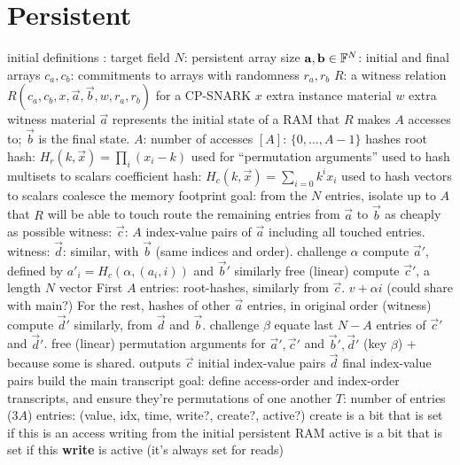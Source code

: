 \section{Persistent}
\begin{outline}
\1 initial definitions
  \2 \FF: target field
  \2 $N$: persistent array size
  \2 $\vec a, \vec b \in \FF^N$: initial and final arrays
  \2 $c_a, c_b$: commitments to arrays with randomness $r_a, r_b$
  \2 $R$: a witness relation $R(c_a, c_b, x, \vec a, \vec b, w, r_a, r_b)$ for a CP-SNARK
    \3 $x$ extra instance material
    \3 $w$ extra witness material
    \3 $\vec a$ represents the initial state of a RAM that $R$ makes $A$
    accesses to; $\vec b$ is the final state.
    \2 $A$: number of accesses 
  \2 $[A]$: $\{0, \dots, A-1\}$
  \2 hashes
    \3 root hash: $H_r(k, \vec x) = \prod_i (x_i - k)$
      \4 used for ``permutation arguments''
      \4 used to hash multisets to scalars
    \3 coefficient hash: $H_c(k, \vec x) = \sum_{i=0} k^ix_i$
      \4 used to hash vectors to scalars
\1 coalesce the memory footprint
  \2 goal: from the $N$ entries, isolate up to $A$ that $R$ will be able to
  touch
    \3 route the remaining entries from $\vec a$ to $\vec b$ as cheaply as
       possible
  \2 witness: $\vec c$: $A$ index-value pairs of $\vec a$ including all touched entries.
  \2 witness: $\vec d$: similar, with $\vec b$ (same indices and order).
  \2 challenge $\alpha$
  \2 compute $\vec a'$, defined by $a'_i = H_c(\alpha, (a_i, i))$ and $\vec b'$ similarly
    \3 free (linear)
  \2 compute $\vec c'$, a length $N$ vector
    \3 First $A$ entries: root-hashes, similarly from $\vec c$.
      \4 $v + \alpha i$
      \4  (could share with main?)
    \3 For the rest, hashes of other $\vec a$ entries, in original order (witness)
  \2 compute $\vec d'$ similarly, from $\vec d$ and $\vec b$.
    \3 
  \2 challenge $\beta$
  \2 equate last $N-A$ entries of $\vec c'$ and $\vec d'$.
    \3 free (linear)
  \2 permutation arguments for $\vec a', \vec c'$ and $\vec b', \vec d'$ (key $\beta$)
    \3  + 
    \3 because some is shared.
  \2 outputs
    \3 $\vec c$ initial index-value pairs
    \3 $\vec d$ final index-value pairs
\1 build the main transcript
  \2 goal: define access-order and index-order transcripts, and ensure they're
  permutations of one another
  \2 $T$: number of entries ($3A$)
  \2 entries: (value, idx, time, write?, create?, active?)
    \3 create is a bit that is set if this is an access writing from the initial persistent RAM
    \3 active is a bit that is set if this \textbf{write} is active (it's always set for reads)

\end{outline}
